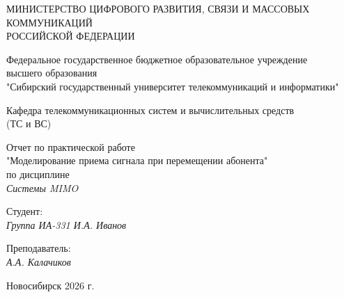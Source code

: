 \thispagestyle{empty}

\begin{center}
    МИНИСТЕРСТВО ЦИФРОВОГО РАЗВИТИЯ, СВЯЗИ И МАССОВЫХ КОММУНИКАЦИЙ \\ РОССИЙСКОЙ ФЕДЕРАЦИИ

    \vspace{20pt}

    Федеральное государственное бюджетное образовательное учреждение \\ высшего образования \\
    "Сибирский государственный университет телекоммуникаций и информатики" \\

    \vspace{20pt}

    Кафедра телекоммуникационных систем и вычислительных средств \\ (ТС и ВС)
\end{center}

\vfill

\begin{center}
    Отчет по практической работе \\
    "Моделирование приема сигнала при перемещении абонента" \\
    по дисциплине \\
    \textit{Системы MIMO}
    \vspace{20pt}
\end{center}

\vfill

\noindent Студент: \\
\textit{Группа ИА-331 \hfill И.А. Иванов}

\vspace{20pt}

\vspace{20pt}

\noindent Преподаватель: \\
\textit{\hfill А.А. Калачиков}

\vfill

\begin{center}
    Новосибирск 2026 г.
\end{center}